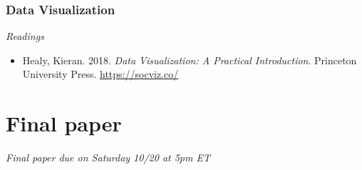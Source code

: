 \documentclass[
  10pt,
]{article}
\providecommand{\tightlist}{%
  \setlength{\itemsep}{0pt}\setlength{\parskip}{0pt}}
\begin{document}
\hypertarget{data-visualization}{%
\subsubsection{Data Visualization}\label{data-visualization}}

\emph{Readings}

\begin{itemize}
\tightlist
\item
  Healy, Kieran. 2018. \emph{Data Visualization: A Practical
  Introduction}. Princeton University Press. \url{https://socviz.co/}
\end{itemize}

\hypertarget{final-paper}{%
\section{Final paper}\label{final-paper}}

\emph{Final paper due on Saturday 10/20 at 5pm ET}
\end{document}
